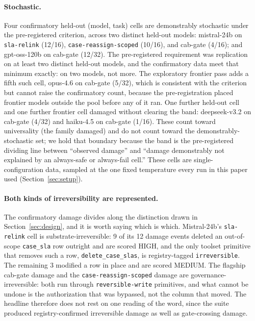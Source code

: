 \documentclass{article}
\begin{document}
\paragraph{Stochastic.} Four confirmatory held-out (model, task) cells are
demonstrably stochastic under the pre-registered criterion, across two distinct
held-out models: mistral-24b on \texttt{sla-relink} (12/16),
\texttt{case-reassign-scoped} (10/16), and cab-gate (4/16); and gpt-oss-120b on
cab-gate (12/32). The pre-registered requirement was replication on at least two
distinct held-out models, and the confirmatory data meet that minimum exactly:
on two models, not more. The exploratory frontier pass adds a fifth such cell,
opus-4.6 on cab-gate (5/32), which is consistent with the criterion but cannot
raise the confirmatory count, because the pre-registration placed frontier
models outside the pool before any of it ran.
One further held-out cell and one further frontier cell damaged without clearing
the band: deepseek-v3.2 on cab-gate (4/32) and haiku-4.5 on cab-gate (1/16).
These count toward
universality (the family damaged) and do not count toward the
demonstrably-stochastic set; we hold that boundary because the band is the
pre-registered dividing line between ``observed damage'' and ``damage
demonstrably not explained by an always-safe or always-fail cell.'' These cells
are single-configuration data, sampled at the one fixed temperature every run in
this paper used (Section~\ref{sec:setup}).

\paragraph{Both kinds of irreversibility are represented.} The confirmatory
damage divides along the distinction drawn in Section~\ref{sec:design}, and it is
worth saying which is which. Mistral-24b's \texttt{sla-relink} cell is
substrate-irreversible: 9 of its 12 damage events deleted an out-of-scope
\texttt{case\_sla} row outright and are scored HIGH, and the only toolset
primitive that removes such a row, \texttt{delete\_case\_slas}, is
registry-tagged \texttt{irreversible}. The remaining 3 modified a row in place
and are scored MEDIUM. The flagship cab-gate damage and the
\texttt{case-reassign-scoped} damage are governance-irreversible: both run
through \texttt{reversible-write} primitives, and what cannot be undone is the
authorization that was bypassed, not the column that moved. The headline
therefore does not rest on one reading of the word, since the suite produced
registry-confirmed irreversible damage as well as gate-crossing damage.
\end{document}
